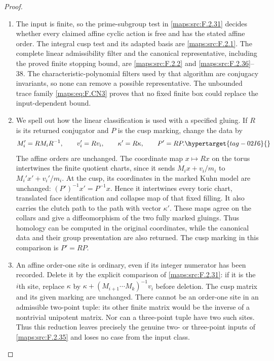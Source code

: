 \documentclass[11pt,a4paper]{article}
\numberwithin{equation}{section}
\theoremstyle{definition}
\begin{document}
\begin{proof}
\begin{enumerate}[label=\arabic*.]
\item The input is finite, so the prime-subgroup test in \ref{maps:src:F.2.31}
decides whether every claimed affine cyclic action is free
and has the stated affine order.  The integral cusp test and
its adapted basis are \ref{maps:src:F.2.1}.  The complete linear admissibility
filter and the canonical representative, including the proved
finite stopping bound, are \ref{maps:src:F.2.2} and \ref{maps:src:F.2.36}--38.  The
characteristic-polynomial filters used by that algorithm are
conjugacy invariants, so none can remove a possible
representative.  The unbounded trace family \eqref{maps:eq:F.CN3} proves
that no fixed finite box could replace the input-dependent
bound.

\item We spell out how the linear classification is used with a
specified gluing.  If $R$ is its returned conjugator and
$P$ is the cusp marking, change the data by
\begin{equation}
 M_i'=RM_iR^{-1},\qquad v_i'=Rv_i,\qquad
 \kappa'=R\kappa,\qquad P'=RP.                           \hypertarget{tag-02I6}{}\label{maps:eq:F.SY1}
\end{equation}
The affine orders are unchanged.  The coordinate map
$x\mapsto Rx$ on the torus intertwines the finite quotient
charts, since it sends $M_ix+v_i/m_i$ to
$M_i'x'+v_i'/m_i$.  At the cusp, its coordinates in the
marked Kuhn model are unchanged:
$(P')^{-1}x'=P^{-1}x$.  Hence it intertwines every toric
chart, translated face identification and collapse map of
that fixed filling.  It also carries the clutch path to
the path with vector $\kappa'$.  These maps agree on the
collars and give a diffeomorphism of the two fully marked
gluings.  Thus homology can be computed in the original
coordinates, while the canonical data and their group
presentation are also returned. The cusp marking in this
comparison is $P'=RP$.

\item An affine order-one site is ordinary, even if its integer
numerator has been recorded.  Delete it by the explicit comparison of \cref{maps:src:F.2.31}: if it is the $i$th site, replace
$\kappa$ by
$\kappa+(M_{i+1}\cdots M_k)^{-1}v_i$ before deletion.
The cusp matrix and its given marking are unchanged.
There cannot be an order-one site in an admissible two-point
tuple: its other finite matrix would be the inverse of a
nontrivial unipotent matrix.  Nor can a three-point tuple
have two such sites.  Thus this reduction leaves precisely
the genuine two- or three-point inputs of \ref{maps:src:F.2.35} and loses
no case from the input class.


\end{enumerate}
\end{proof}
\end{document}
